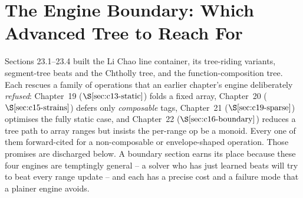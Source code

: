 \section{The Engine Boundary: Which Advanced Tree to Reach For}\label{sec:c29-boundary}

\begin{previouslybox}
Sections 23.1--23.4 built the Li Chao line container, its tree-riding variants,
segment-tree beats and the Chtholly tree, and the function-composition tree.  Each
rescues a family of operations that an earlier chapter's engine deliberately
\emph{refused}: Chapter~19 (\(\secref{c13-static}\)) folds a fixed array,
Chapter~20 (\(\secref{c15-strains}\)) defers only \emph{composable} tags,
Chapter~21 (\(\secref{c19-sparse}\)) optimises the fully static case, and
Chapter~22 (\(\secref{c16-boundary}\)) reduces a tree path to array ranges but
insists the per-range op be a monoid.  Every one of them forward-cited 
for a non-composable or envelope-shaped operation.  Those promises are discharged
below.  A boundary section earns its place because these four engines are
temptingly general -- a solver who has just learned beats will try to beat every
range update -- and each has a precise cost and a failure mode that a plainer
engine avoids.
\end{previouslybox}

